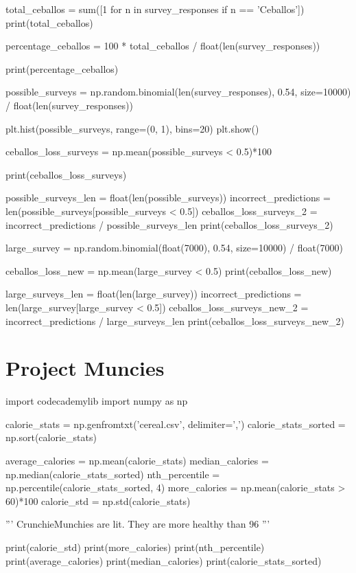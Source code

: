 \documentclass{journal}
\begin{document}
total_ceballos = sum([1 for n in survey_responses if n == 'Ceballos'])
print(total_ceballos)

percentage_ceballos = 100 * total_ceballos / float(len(survey_responses))

print(percentage_ceballos)

possible_surveys = np.random.binomial(len(survey_responses), 0.54, size=10000) / float(len(survey_responses))

plt.hist(possible_surveys, range=(0, 1), bins=20)
plt.show()

ceballos_loss_surveys = np.mean(possible_surveys < 0.5)*100

print(ceballos_loss_surveys)

possible_surveys_len = float(len(possible_surveys))
incorrect_predictions = len(possible_surveys[possible_surveys < 0.5])
ceballos_loss_surveys_2 = incorrect_predictions / possible_surveys_len
print(ceballos_loss_surveys_2)

large_survey = np.random.binomial(float(7000), 0.54, size=10000) / float(7000)

ceballos_loss_new = np.mean(large_survey < 0.5)
print(ceballos_loss_new)


large_surveys_len = float(len(large_survey))
incorrect_predictions = len(large_survey[large_survey < 0.5])
ceballos_loss_surveys_new_2 = incorrect_predictions / large_surveys_len
print(ceballos_loss_surveys_new_2)

\section{Project Muncies}
import codecademylib
import numpy as np

calorie_stats = np.genfromtxt('cereal.csv', delimiter=',')
calorie_stats_sorted = np.sort(calorie_stats)

average_calories = np.mean(calorie_stats)
median_calories = np.median(calorie_stats_sorted)
nth_percentile = np.percentile(calorie_stats_sorted, 4)
more_calories = np.mean(calorie_stats > 60)*100
calorie_std = np.std(calorie_stats)

'''
CrunchieMunchies are lit. They are more healthy than 96%
'''

print(calorie_std)
print(more_calories)
print(nth_percentile)
print(average_calories)
print(median_calories)
print(calorie_stats_sorted)
\end{document}
